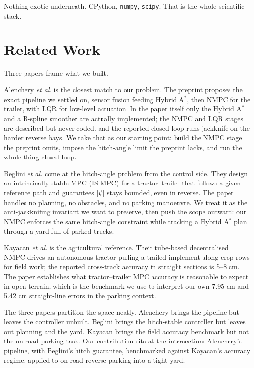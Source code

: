 \documentclass[conference]{IEEEtran}
\begin{document}
Nothing exotic underneath. CPython, \texttt{numpy}, \texttt{scipy}. That
is the whole scientific stack.

\section{Related Work}

Three papers frame what we built.

Alenchery \textit{et al.} \cite{Alenchery2026} is the closest match to
our problem. The preprint proposes the exact pipeline we settled on,
sensor fusion feeding Hybrid A$^{*}$, then NMPC for the trailer, with
LQR for low-level actuation. In the paper itself only the Hybrid A$^{*}$
and a B-spline smoother are actually implemented; the NMPC and LQR
stages are described but never coded, and the reported closed-loop runs
jackknife on the harder reverse bays. We take that as our starting
point: build the NMPC stage the preprint omits, impose the hitch-angle
limit the preprint lacks, and run the whole thing closed-loop.

Beglini \textit{et al.} \cite{Beglini2022} come at the hitch-angle
problem from the control side. They design an intrinsically stable MPC
(IS-MPC) for a tractor--trailer that follows a given reference path and
guarantees $|\psi|$ stays bounded, even in reverse. The paper handles no
planning, no obstacles, and no parking manoeuvre. We treat it as the
anti-jackknifing invariant we want to preserve, then push the scope
outward: our NMPC enforces the same hitch-angle constraint while
tracking a Hybrid A$^{*}$ plan through a yard full of parked trucks.

Kayacan \textit{et al.} \cite{Kayacan2015} is the agricultural reference.
Their tube-based decentralised NMPC drives an autonomous tractor pulling
a trailed implement along crop rows for field work; the reported
cross-track accuracy in straight sections is 5--8 cm. The paper
establishes what tractor--trailer MPC accuracy is reasonable to expect
in open terrain, which is the benchmark we use to interpret our own
7.95 cm and 5.42 cm straight-line errors in the parking context.

The three papers partition the space neatly. Alenchery brings the
pipeline but leaves the controller unbuilt. Beglini brings the
hitch-stable controller but leaves out planning and the yard. Kayacan
brings the field accuracy benchmark but not the on-road parking task.
Our contribution sits at the intersection: Alenchery's pipeline, with
Beglini's hitch guarantee, benchmarked against Kayacan's accuracy
regime, applied to on-road reverse parking into a tight yard.
\end{document}
